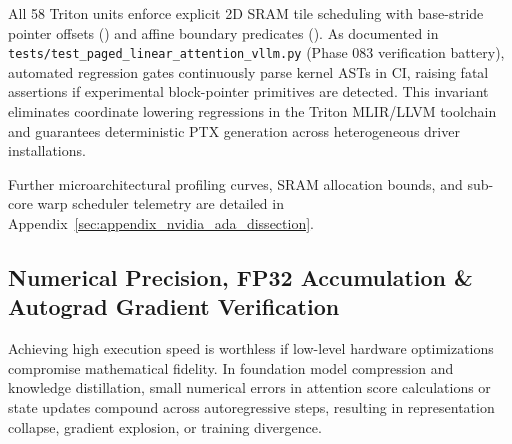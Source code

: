 All 58 Triton units enforce explicit 2D SRAM tile scheduling with base-stride pointer offsets () and affine boundary predicates (). As documented in \texttt{tests/test\_paged\_linear\_attention\_vllm.py} (Phase 083 verification battery), automated regression gates continuously parse kernel ASTs in CI, raising fatal assertions if experimental block-pointer primitives are detected. This invariant eliminates coordinate lowering regressions in the Triton MLIR/LLVM toolchain and guarantees deterministic PTX generation across heterogeneous driver installations.

Further microarchitectural profiling curves, SRAM allocation bounds, and sub-core warp scheduler telemetry are detailed in Appendix~\ref{sec:appendix_nvidia_ada_dissection}.

\subsection{Numerical Precision, FP32 Accumulation \& Autograd Gradient Verification}
\label{subsec:numerical_precision_autograd}

Achieving high execution speed is worthless if low-level hardware optimizations compromise mathematical fidelity. In foundation model compression and knowledge distillation, small numerical errors in attention score calculations or state updates compound across autoregressive steps, resulting in representation collapse, gradient explosion, or training divergence.

